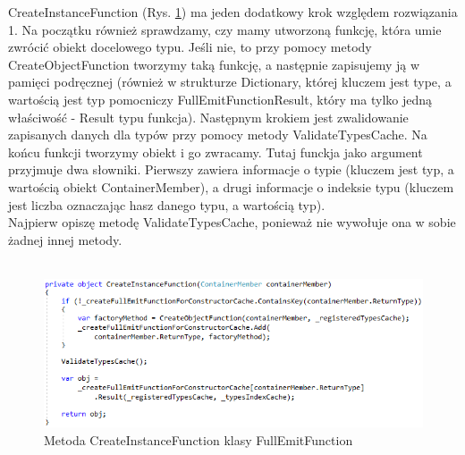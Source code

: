 \documentclass[12pt]{article}
\begin{document}
CreateInstanceFunction (Rys. \ref{fig:FullEmitFunction_CreateInstanceFunction}) ma jeden dodatkowy krok względem rozwiązania 1. Na początku również sprawdzamy, czy mamy utworzoną funkcję, która umie zwrócić obiekt docelowego typu. Jeśli nie, to przy pomocy metody CreateObjectFunction tworzymy taką funkcję, a następnie zapisujemy ją w pamięci podręcznej (również w strukturze Dictionary, której kluczem jest type, a wartością jest typ pomocniczy FullEmitFunctionResult, który ma tylko jedną właściwość - Result typu funkcja). Następnym krokiem jest zwalidowanie zapisanych danych dla typów przy pomocy metody ValidateTypesCache. Na końcu funkcji tworzymy obiekt  i go zwracamy. Tutaj funckja jako argument przyjmuje dwa słowniki. Pierwszy zawiera informacje o typie (kluczem jest typ, a wartością obiekt ContainerMember), a drugi informacje o indeksie typu (kluczem jest liczba oznaczając hasz danego typu, a wartością typ).\\
Najpierw opiszę metodę ValidateTypesCache, ponieważ nie wywołuje ona w sobie żadnej innej metody.\\ \\
\begin{figure}[H]
	\begin{center}
  		\includegraphics{FullEmitFunction_CreateInstanceFunction.png}
  		\caption{Metoda CreateInstanceFunction klasy FullEmitFunction}
  		\label{fig:FullEmitFunction_CreateInstanceFunction}
	\end{center}
\end{figure}
\end{document}
